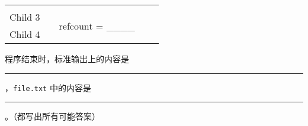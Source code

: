 \begin{problems}
\begin{table}[H]
\begin{tabular}{ccccc}
                &  &  & \multicolumn{1}{c|}{} & \multicolumn{1}{c|}{} \\ \cline{1-1} \cline{3-3}
                \multicolumn{1}{|c|}{Child 3} & \multicolumn{1}{c|}{} & \multicolumn{1}{c|}{\multirow{2}{*}{refcount = \_\_\_\_}} & \multicolumn{1}{c|}{} & \multicolumn{1}{c|}{} \\ \cline{1-1}
                \multicolumn{1}{|c|}{Child 4} & \multicolumn{1}{c|}{} & \multicolumn{1}{c|}{} & \multicolumn{1}{c|}{} & \multicolumn{1}{c|}{} \\ \cline{1-1} \cline{3-3} \cline{5-5} 
            \end{tabular}
        \end{table}
        \qn 程序结束时，标准输出上的内容是 \rule{3.5cm}{0.25mm}，\verb|file.txt| 中的内容是 \rule{3.5cm}{0.25mm}。（都写出所有可能答案）
    \end{problems}

